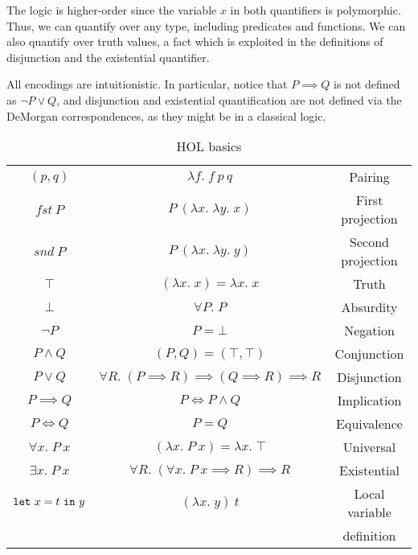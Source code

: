 The logic is higher-order since the variable $x$ in both quantifiers is polymorphic. Thus, we can quantify over any type, including predicates and functions. We can also quantify over truth values, a fact which is exploited in the definitions of disjunction and the existential quantifier.

All encodings are intuitionistic. In particular, notice that \mbox{$P \implies Q$} is not defined as $\neg P \vee Q$, and disjunction and existential quantification are not defined via the DeMorgan correspondences, as they might be in a classical logic.

\begin{table}
\begin{center}
\begin{tabular}{|c|c|c|}
\hline
$(p,q)$          & $\lambda f.\; f\ p\ q$                  & Pairing\\
$fst\ P$         & $P\ (\lambda x.\;\lambda y.\; x)$                & First projection\\
$snd\ P$         & $P\ (\lambda x.\;\lambda y.\; y)$                & Second projection\\
$\top$           & $(\lambda x.\; x) = \lambda x.\; x$       & Truth\\
$\bot$           & $\forall P.\; P$                        & Absurdity\\
$\neg P$         & $P = \bot$                            & Negation\\
$P \wedge Q$     & $(P,Q) = (\top,\top)$                 & Conjunction\\
$P \vee Q$       & $\forall R.\; (P \implies R) \implies (Q \implies R) \implies R$  &Disjunction\\
$P \implies Q$   & $P \iff P \wedge Q$                   & Implication\\
$P \iff Q$       & $P = Q$                               & Equivalence\\
$\forall x.\; P\ x$ & $(\lambda x.\; P\ x) = \lambda x.\; \top$ & Universal\\
$\exists x.\; P\ x$ & $\forall R.\; (\forall x.\; P\ x \implies R) \implies R$ & Existential\\
$\code{let}\ x=t\ \code{in}\ y$ & $(\lambda x.\; y)\ t$ & Local variable\\
&& definition\\
\hline
\end{tabular}
\end{center}
\caption{HOL basics}
\label{table:HOL}
\end{table}

